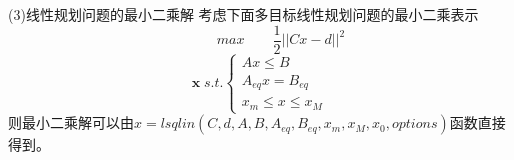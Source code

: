 \documentclass[12pt]{beamer}
\begin{document}
\begin{frame}[allowframebreaks]{(3)线性规划问题的最小二乘解}
	考虑下面多目标线性规划问题的最小二乘表示
		$$\quad \qquad max \qquad \frac{1}{2}||Cx-d||^2$$
	$$
	\textbf{x}\;s.t.
	\left\{
	\begin{array}{ccc}
		Ax\leq B\\
		A_{eq}x=B_{eq}\\
		x_m\leq x\leq x_M
	\end{array} 
	\right.
	$$
	则最小二乘解可以由$x = lsqlin(C,d,A,B,A_{eq},B_{eq},x_m,x_M,x_0,options)$函数直接得到。

\end{frame}
\end{document}
